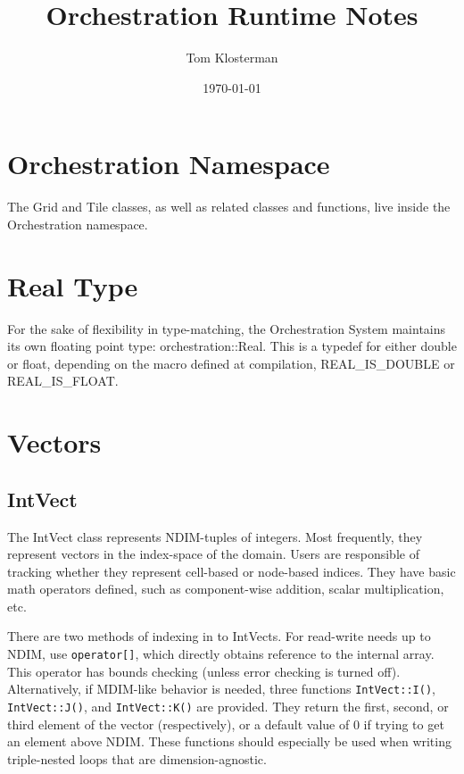 \documentclass[letterpaper,12pt]{article}
\begin{document}
\title{Orchestration Runtime Notes}
\author{Tom Klosterman}
\date{\today}
\maketitle

\begin{abstract}

\end{abstract}


\section{Orchestration Namespace}

The Grid and Tile classes, as well as related classes and functions, live inside the Orchestration namespace.


\section{Real Type}

For the sake of flexibility in type-matching, the Orchestration System maintains its own floating point type: orchestration::Real. This is a typedef for either double or float, depending on the macro defined at compilation, REAL\_IS\_DOUBLE or REAL\_IS\_FLOAT.

\section{Vectors}
\subsection{IntVect}

The IntVect class represents NDIM-tuples of integers. Most frequently, they represent vectors in the index-space of the domain. Users are responsible of tracking whether they represent cell-based or node-based indices. They have basic math operators defined, such as component-wise addition, scalar multiplication, etc.

There are two methods of indexing in to IntVects. For read-write needs up to NDIM, use  \texttt{operator[]}, which directly obtains reference to the internal array. This operator has bounds checking (unless error checking is turned off). Alternatively, if MDIM-like behavior is needed, three functions \texttt{IntVect::I()}, \texttt{IntVect::J()}, and \texttt{IntVect::K()} are provided. They return the first, second, or third element of the vector (respectively), or a default value of 0 if trying to get an element above NDIM. These functions should especially be used when writing triple-nested loops that are dimension-agnostic.
\end{document}
